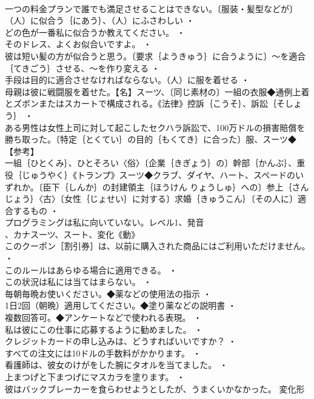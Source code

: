 \documentclass[8pt]{extreport}
\begin{document}
\begin{CJK}{UTF8}{min}
\\	一つの料金プランで誰でも満足させることはできない。〔服装・髪型などが〕（人）に似合う｛にあう｝、（人）にふさわしい ・
\\	どの色が一番私に似合うか教えてください。 ・
\\	そのドレス、よくお似合いですよ。 ・
\\	彼は短い髪の方が似合うと思う。〔要求｛ようきゅう｝に合うように〕～を適合｛てきごう｝させる、～を作り変える ・
\\	手段は目的に適合させなければならない。（人）に服を着せる ・
\\	母親は彼に戦闘服を着せた。【名】スーツ、〔同じ素材の〕一組の衣服◆通例上着とズボンまたはスカートで構成される。《法律》控訴｛こうそ｝、訴訟｛そしょう｝ ・
\\	ある男性は女性上司に対して起こしたセクハラ訴訟で、100万ドルの損害賠償を勝ち取った。〔特定｛とくてい｝の目的｛もくてき｝に合った〕服、スーツ◆【参考】
\\	一組｛ひとくみ｝、ひとそろい〈俗〉〔企業｛きぎょう｝の〕幹部｛かんぶ｝、重役｛じゅうやく｝《トランプ》スーツ◆クラブ、ダイヤ、ハート、スペードのいずれか。〔臣下｛しんか｝の封建領主｛ほうけん りょうしゅ｝への〕参上｛さんじょう｝〈古〉〔女性｛じょせい｝に対する〕求婚｛きゅうこん｝〔その人に〕適合するもの ・
\\	プログラミングは私に向いていない。レベル1、発音
\\	、カナスーツ、スート、変化《動》
\\	このクーポン［割引券］は、以前に購入された商品にはご利用いただけません。 ・
\\	このルールはあらゆる場合に適用できる。 ・
\\	この状況は私には当てはまらない。 ・
\\	毎朝毎晩お使いください。◆薬などの使用法の指示 ・
\\	1日2回（朝晩）適用してください。◆塗り薬などの説明書 ・
\\	複数回答可。◆アンケートなどで使われる表現。 ・
\\	私は彼にこの仕事に応募するように勧めました。 ・
\\	クレジットカードの申し込みは、どうすればいいですか？ ・
\\	すべての注文には10ドルの手数料がかかります。 ・
\\	看護師は、彼女のけがをした腕にタオルを当てました。 ・
\\	上まつげと下まつげにマスカラを塗ります。 ・
\\	彼はバックブレーカーを食らわせようとしたが、うまくいかなかった。	変化形 

\end{CJK}
\end{document}
